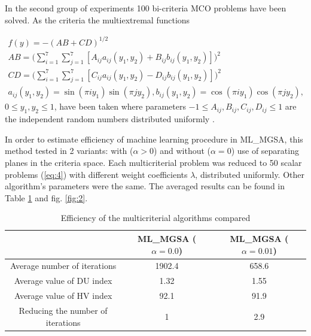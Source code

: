 \documentclass[runningheads]{llncs}
\begin{document}
In the second group of experiments 100 bi-criteria MCO problems have been solved. As the criteria the multiextremal functions

\begin{equation}
\begin{matrix}
f(y) = - (AB + CD)^{1/2} \\
AB = \Big(\sum_{i=1}^7 \sum_{j=1}^7 [A_{ij} a_{ij}(y_1, y_2) + B_{ij} b_{ij}(y_1, y_2)]\Big)^2 \\
CD = \Big(\sum_{i=1}^7 \sum_{j=1}^7 [C_{ij} a_{ij}(y_1, y_2) - D_{ij} b_{ij}(y_1, y_2)]\Big)^2 \\ 
a_{ij}(y_1, y_2) = \sin(\pi i y_1) \sin(\pi j y_2), b_{ij}(y_1, y_2) = \cos(\pi i y_1) \cos(\pi j y_2),
\end{matrix}
\end{equation}
$0 \leq y_1,y_2 \leq 1$, have been taken where parameters $-1 \leq A_{ij},B_{ij},C_{ij},D_{ij} \leq 1$ are the independent random numbers distributed uniformly \cite{Gergel2019_2,Grishagin2015_2}.

In order to estimate efficiency of machine learning procedure in ML\_MGSA, this method tested in 2 variants: with ($\alpha>0$) and without ($\alpha=0$)
use of separating planes in the criteria space. 
Each multicriterial problem was reduced to 50 scalar problems (\ref{eq:4}) with different weight coefficients $\lambda$, distributed uniformly. Other algorithm's parameters were the same. The averaged results can be found in Table \ref{tab:2} and fig. \ref{fig:2}.

\begin{table}
\caption{Efficiency of the multicriterial algorithms compared}
\label{tab:2}
\begin{tabular}{ccc}
\hline
                                  & ML\_MGSA ($\alpha=0.0$) & ML\_MGSA ($\alpha=0.01$) \\ \hline
Average number of iterations      & 1902.4           & 658.6             \\
Average value of DU index        & 1.32             & 1.55              \\
Average value of HV index         & 92.1             & 91.9              \\
Reducing the number of iterations & 1                & 2.9     \\  \hline        
\end{tabular}
\end{table}
\end{document}
